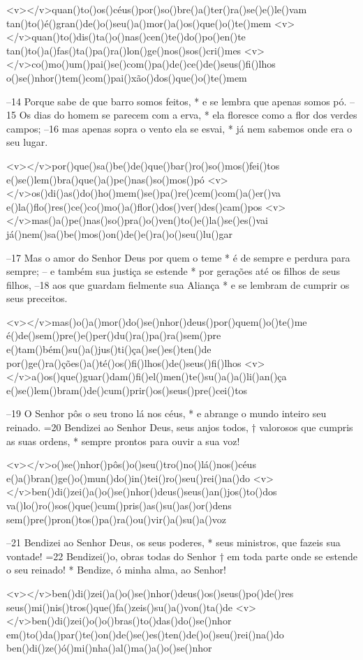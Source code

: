 <v></v>quan()to()os()céus()por()so()bre()a()ter()ra()se()e()le()vam
tan()to()é()gran()de()o()seu()a()mor()a()os()que()o()te()mem
<v></v>quan()to()dis()ta()o()nas()cen()te()do()po()en()te
tan()to()a()fas()ta()pa()ra()lon()ge()nos()sos()cri()mes
<v></v>co()mo()um()pai()se()com()pa()de()ce()de()seus()fi()lhos
o()se()nhor()tem()com()pai()xão()dos()que()o()te()mem

–14 Porque sabe de que barro somos feitos, *
e se lembra que apenas somos pó.
–15 Os dias do homem se parecem com a erva, *
ela floresce como a flor dos verdes campos;
–16 mas apenas sopra o vento ela se esvai, *
já nem sabemos onde era o seu lugar.

<v></v>por()que()sa()be()de()que()bar()ro()so()mos()fei()tos
e()se()lem()bra()que()a()pe()nas()so()mos()pó
<v></v>os()di()as()do()ho()mem()se()pa()re()cem()com()a()er()va
e()la()flo()res()ce()co()mo()a()flor()dos()ver()des()cam()pos
<v></v>mas()a()pe()nas()so()pra()o()ven()to()e()la()se()es()vai
já()nem()sa()be()mos()on()de()e()ra()o()seu()lu()gar

–17 Mas o amor do Senhor Deus por quem o teme *
é de sempre e perdura para sempre;
– e também sua justiça se estende *
por gerações até os filhos de seus filhos,
–18 aos que guardam fielmente sua Aliança *
e se lembram de cumprir os seus preceitos.

<v></v>mas()o()a()mor()do()se()nhor()deus()por()quem()o()te()me
é()de()sem()pre()e()per()du()ra()pa()ra()sem()pre
e()tam()bém()su()a()jus()ti()ça()se()es()ten()de
por()ge()ra()ções()a()té()os()fi()lhos()de()seus()fi()lhos
<v></v>a()os()que()guar()dam()fi()el()men()te()su()a()a()li()an()ça
e()se()lem()bram()de()cum()prir()os()seus()pre()cei()tos

–19 O Senhor pôs o seu trono lá nos céus, *
e abrange o mundo inteiro seu reinado.
=20 Bendizei ao Senhor Deus, seus anjos todos, †
valorosos que cumpris as suas ordens, *
sempre prontos para ouvir a sua voz!

<v></v>o()se()nhor()pôs()o()seu()tro()no()lá()nos()céus
e()a()bran()ge()o()mun()do()in()tei()ro()seu()rei()na()do
<v></v>ben()di()zei()a()o()se()nhor()deus()seus()an()jos()to()dos
va()lo()ro()sos()que()cum()pris()as()su()as()or()dens
sem()pre()pron()tos()pa()ra()ou()vir()a()su()a()voz

–21 Bendizei ao Senhor Deus, os seus poderes, *
seus ministros, que fazeis sua vontade!
=22 Bendizei()o, obras todas do Senhor †
em toda parte onde se estende o seu reinado! *
Bendize, ó minha alma, ao Senhor!

<v></v>ben()di()zei()a()o()se()nhor()deus()os()seus()po()de()res
seus()mi()nis()tros()que()fa()zeis()su()a()von()ta()de
<v></v>ben()di()zei()o()o()bras()to()das()do()se()nhor
em()to()da()par()te()on()de()se()es()ten()de()o()seu()rei()na()do
ben()di()ze()ó()mi()nha()al()ma()a()o()se()nhor